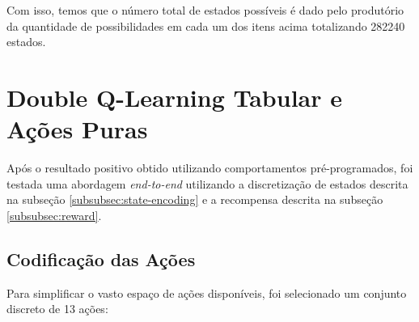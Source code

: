 Com isso, temos que o número total de estados possíveis é dado pelo produtório da quantidade de possibilidades em cada um dos itens acima totalizando 282240 estados.

\section{Double Q-Learning Tabular e Ações Puras}




Após o resultado positivo obtido utilizando comportamentos pré-programados, foi testada uma abordagem \textit{end-to-end} utilizando a discretização de estados descrita na subseção \ref{subsubsec:state-encoding} e a recompensa descrita na subseção \ref{subsubsec:reward}.


\subsection{Codificação das Ações}

Para simplificar o vasto espaço de ações disponíveis, foi selecionado um conjunto discreto de 13 ações:

